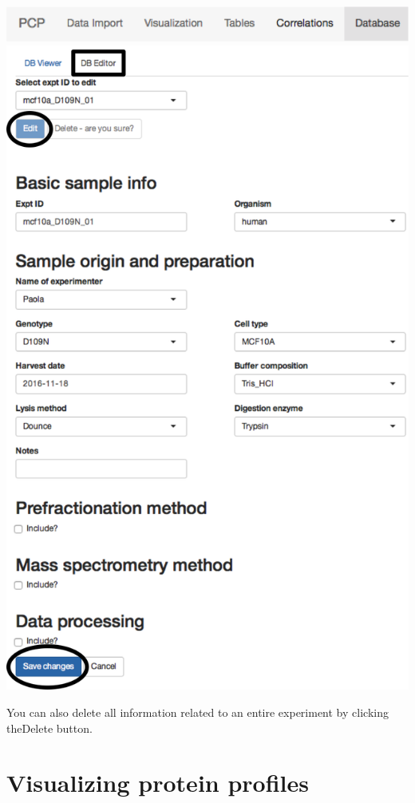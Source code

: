 \documentclass[letterpaper, twocolumn, 9pt]{article}
\begin{document}
\includegraphics[width=\columnwidth]{figures/ss_appOverview04.png}
\includegraphics[width=\columnwidth, trim={0 20cm 5cm 0},clip]{figures/ss_dbeditor.png}

You can also delete all information related to an entire experiment by clicking the\textsf{Delete} button.

\section{Visualizing protein profiles}
\end{document}
